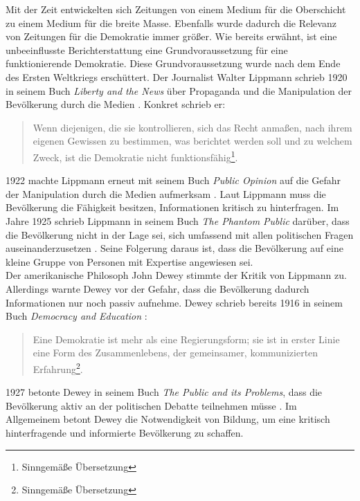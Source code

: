 Mit der Zeit entwickelten sich Zeitungen von einem Medium für die Oberschicht zu einem Medium für die breite Masse.
Ebenfalls wurde dadurch die Relevanz von Zeitungen für die Demokratie immer größer.
Wie bereits erwähnt, ist eine unbeeinflusste Berichterstattung eine Grundvoraussetzung für eine funktionierende Demokratie.
Diese Grundvoraussetzung wurde nach dem Ende des Ersten Weltkriegs erschüttert.
Der Journalist Walter Lippmann schrieb 1920 in seinem Buch \textit{Liberty and the News} über Propaganda und die Manipulation der Bevölkerung durch die Medien \cite{liberty-and-news}.
Konkret schrieb er:
\begin{quote}
    \glqq Wenn diejenigen, die sie kontrollieren, sich das Recht anmaßen, nach ihrem eigenen Gewissen zu bestimmen, was berichtet werden soll und zu welchem Zweck, ist die Demokratie nicht funktionsfähig\grqq{}\footnote{Sinngemäße Übersetzung}.
\end{quote}
1922 machte Lippmann erneut mit seinem Buch \textit{Public Opinion} auf die Gefahr der Manipulation durch die Medien aufmerksam \cite{public-opinion}.
Laut Lippmann muss die Bevölkerung die Fähigkeit besitzen, Informationen kritisch zu hinterfragen.
Im Jahre 1925 schrieb Lippmann in seinem Buch \textit{The Phantom Public} darüber, dass die Bevölkerung nicht in der Lage sei, sich umfassend mit allen politischen Fragen auseinanderzusetzen \cite{phantom-public}.
Seine Folgerung daraus ist, dass die Bevölkerung auf eine kleine Gruppe von Personen mit Expertise angewiesen sei. \\

Der amerikanische Philosoph John Dewey stimmte der Kritik von Lippmann zu.
Allerdings warnte Dewey vor der Gefahr, dass die Bevölkerung dadurch Informationen nur noch passiv aufnehme.
Dewey schrieb bereits 1916 in seinem Buch \textit{Democracy and Education} \cite{democracy-and-education}:
\begin{quote}
    \glqq Eine Demokratie ist mehr als eine Regierungsform; sie ist in erster Linie eine Form des Zusammenlebens, der gemeinsamer, kommunizierten Erfahrung\grqq{}\footnote{Sinngemäße Übersetzung}.
\end{quote}
1927 betonte Dewey in seinem Buch \textit{The Public and its Problems}, dass die Bevölkerung aktiv an der politischen Debatte teilnehmen müsse \cite{public-problems}.
Im Allgemeinem betont Dewey die Notwendigkeit von Bildung, um eine kritisch hinterfragende und informierte Bevölkerung zu schaffen.\\


